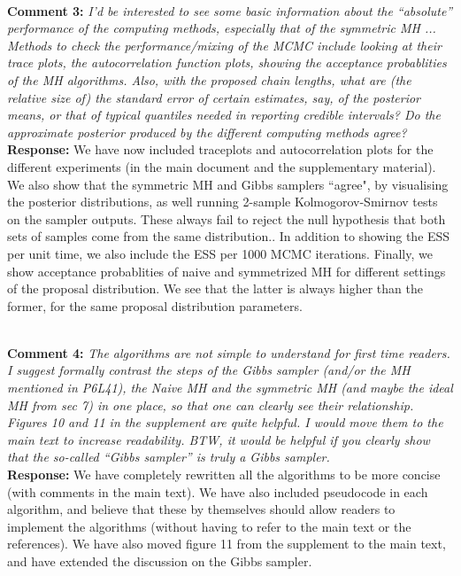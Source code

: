 \documentclass[11pt]{article}
\newcommand{\rev}[2]{\textbf{Comment #1: }\emph{#2}}
\newcommand{\resp}{\textbf{Response: }}
\begin{document}
~\\ 
\rev{3}{I’d be interested to see some basic information about the “absolute” performance of the computing methods, especially that of the symmetric MH ... Methods to check the performance/mixing of the MCMC include looking at their trace plots, the autocorrelation function plots, showing the acceptance probablities of the MH algorithms. Also, with the proposed chain lengths, what are (the relative size of) the standard error of certain estimates, say, of the posterior means, or that of typical quantiles needed in reporting credible intervals? Do the approximate posterior produced by the different computing methods agree? }
\\
\resp We have now included traceplots and autocorrelation plots for the different experiments (in the main document and the supplementary material). We also show that the symmetric MH and Gibbs samplers ``agree", by visualising the posterior distributions, as well running 2-sample Kolmogorov-Smirnov tests on the sampler outputs. These always fail to reject the null hypothesis that both sets of samples come from the same distribution..
In addition to showing the ESS per unit time, we also include the ESS per 1000 MCMC iterations. 
Finally, we show acceptance probablities of naive and symmetrized MH for different settings of the proposal distribution. We see that the latter is always higher than the former, for the same proposal distribution parameters.

~\\
\rev{4}{The algorithms are not simple to understand for first time readers. I suggest formally contrast the steps of the Gibbs sampler (and/or the MH mentioned in P6L41), the Naive MH and the symmetric MH (and maybe the ideal MH from sec 7) in one place, so that one can clearly see their relationship.  Figures 10 and 11 in the supplement are quite helpful. I would move them to the main text to increase readability.
BTW, it would be helpful if you clearly show that the so-called “Gibbs sampler” is truly a Gibbs sampler.}
\\ 
\resp We have completely rewritten all the algorithms to be more concise (with comments in the main text). We have also included pseudocode in each algorithm, and believe that these by themselves should allow readers to implement the algorithms (without having to refer to the main text or the references). We have also moved figure 11 from the supplement to the main text, and have extended the discussion on the Gibbs sampler.
\end{document}
